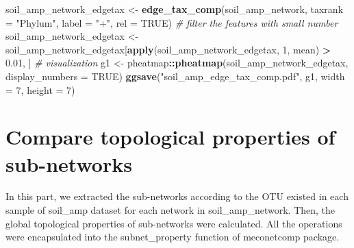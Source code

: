\documentclass[
]{book}
\newenvironment{Shaded}{\begin{snugshade}}{\end{snugshade}}
\newcommand{\AttributeTok}[1]{\textcolor[rgb]{0.13,0.29,0.53}{#1}}
\newcommand{\CommentTok}[1]{\textcolor[rgb]{0.56,0.35,0.01}{\textit{#1}}}
\newcommand{\ConstantTok}[1]{\textcolor[rgb]{0.56,0.35,0.01}{#1}}
\newcommand{\DecValTok}[1]{\textcolor[rgb]{0.00,0.00,0.81}{#1}}
\newcommand{\FloatTok}[1]{\textcolor[rgb]{0.00,0.00,0.81}{#1}}
\newcommand{\FunctionTok}[1]{\textcolor[rgb]{0.13,0.29,0.53}{\textbf{#1}}}
\newcommand{\NormalTok}[1]{#1}
\newcommand{\OtherTok}[1]{\textcolor[rgb]{0.56,0.35,0.01}{#1}}
\newcommand{\SpecialCharTok}[1]{\textcolor[rgb]{0.81,0.36,0.00}{\textbf{#1}}}
\newcommand{\StringTok}[1]{\textcolor[rgb]{0.31,0.60,0.02}{#1}}
\begin{document}
\begin{Shaded}
\begin{Highlighting}[]
\NormalTok{soil\_amp\_network\_edgetax }\OtherTok{\textless{}{-}} \FunctionTok{edge\_tax\_comp}\NormalTok{(soil\_amp\_network, }\AttributeTok{taxrank =} \StringTok{"Phylum"}\NormalTok{, }\AttributeTok{label =} \StringTok{"+"}\NormalTok{, }\AttributeTok{rel =} \ConstantTok{TRUE}\NormalTok{)}
\CommentTok{\# filter the features with small number}
\NormalTok{soil\_amp\_network\_edgetax }\OtherTok{\textless{}{-}}\NormalTok{ soil\_amp\_network\_edgetax[}\FunctionTok{apply}\NormalTok{(soil\_amp\_network\_edgetax, }\DecValTok{1}\NormalTok{, mean) }\SpecialCharTok{\textgreater{}} \FloatTok{0.01}\NormalTok{, ]}
\CommentTok{\# visualization}
\NormalTok{g1 }\OtherTok{\textless{}{-}}\NormalTok{ pheatmap}\SpecialCharTok{::}\FunctionTok{pheatmap}\NormalTok{(soil\_amp\_network\_edgetax, }\AttributeTok{display\_numbers =} \ConstantTok{TRUE}\NormalTok{)}
\FunctionTok{ggsave}\NormalTok{(}\StringTok{"soil\_amp\_edge\_tax\_comp.pdf"}\NormalTok{, g1, }\AttributeTok{width =} \DecValTok{7}\NormalTok{, }\AttributeTok{height =} \DecValTok{7}\NormalTok{)}
\end{Highlighting}
\end{Shaded}

\section{Compare topological properties of sub-networks}\label{compare-topological-properties-of-sub-networks}

In this part, we extracted the sub-networks according to the OTU existed in each sample of soil\_amp dataset for each network in soil\_amp\_network.
Then, the global topological properties of sub-networks were calculated.
All the operations were encapsulated into the subnet\_property function of meconetcomp package.
\end{document}
